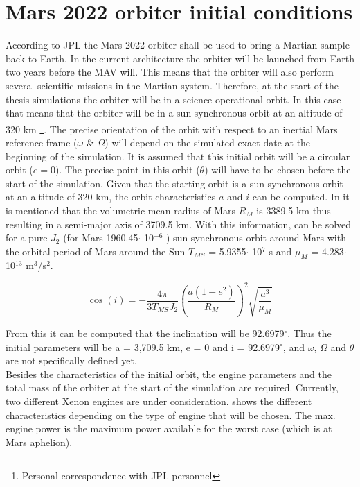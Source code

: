 \section{Mars 2022 orbiter initial conditions}
\label{sec:2022_ini_con}
According to \ac{JPL} the Mars 2022 orbiter shall be used to bring a Martian sample back to Earth. In the current architecture the orbiter will be launched from Earth two years before the \ac{MAV} will. This means that the orbiter will also perform several scientific missions in the Martian system. Therefore, at the start of the thesis simulations the orbiter will be in a science operational orbit. In this case that means that the orbiter will be in a sun-synchronous orbit at an altitude of 320 km \footnote{\label{foot:pers_cor} Personal correspondence with \ac{JPL} personnel}. The precise orientation of the orbit with respect to an inertial Mars reference frame ($\omega$ \& $\Omega$) will depend on the simulated exact date at the beginning of the simulation. It is assumed that this initial orbit will be a circular orbit ($e=0$). The precise point in this orbit ($\theta$) will have to be chosen before the start of the simulation. Given that the starting orbit is a sun-synchronous orbit at an altitude of 320 km, the orbit characteristics $a$ and $i$ can be computed. In \cite{williams2015} it is mentioned that the volumetric mean radius of Mars $R_{M}$ is 3389.5 km thus resulting in a semi-major axis of 3709.5 km. With this information,  \cite{noomen2011kepler} can be solved for a pure $J_{2}$ (for Mars 1960.45$\cdot$ 10$^{-6}$ \cite{williams2015}) sun-synchronous orbit around Mars with the orbital period of Mars around the Sun $T_{MS}$ = 5.9355$\cdot$ 10$^{7}$ s and $\mu_{M}$ = 4.283$\cdot$ 10$^{13}$ m$^{3}$/s$^{2}$.



\begin{equation} \label{eq:sun-synch}
\cos\left(i\right)=-\dfrac{4\pi}{3T_{MS}J_{2}}\left(\dfrac{a\left(1-e^{2}\right)}{R_{M}}\right)^{2}\sqrt{\dfrac{a^{3}}{\mu_{M}}}
\end{equation}

From this it can be computed that the inclination will be 92.6979$^\circ$. Thus the initial parameters will be a = 3,709.5 km, e = 0 and i = 92.6979$^\circ$, and $\omega$, $\Omega$ and $\theta$ are not specifically defined yet. \\
Besides the characteristics of the initial orbit, the engine parameters and the total mass of the orbiter at the start of the simulation are required. Currently, two different Xenon engines are under consideration.  shows the different characteristics depending on the type of engine that will be chosen. The max. engine power is the maximum power available for the worst case (which is at Mars aphelion).


